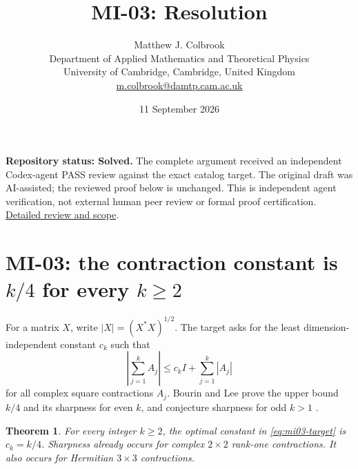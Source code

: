 \documentclass[10pt,a4paper]{article}
\title{MI-03: Resolution}
\author{Matthew J. Colbrook\\
\small Department of Applied Mathematics and Theoretical Physics\\
\small University of Cambridge, Cambridge, United Kingdom\\
\small\href{mailto:m.colbrook@damtp.cam.ac.uk}{m.colbrook@damtp.cam.ac.uk}}
\date{11 September 2026}
\newtheorem{theorem}{Theorem}[section]
\theoremstyle{remark}
\begin{document}
\maketitle
\textbf{Repository status: Solved.}
The complete argument received an independent Codex-agent PASS review
against the exact catalog target.
The original draft was AI-assisted; the reviewed proof below is unchanged.
This is independent agent verification, not external human peer review or
formal proof certification. \href{https://github.com/ajt60gaibb/OpenProblemsInNLA/blob/main/references/colbrook-matrix-2026-09-11/verification/reviews/MI-03-review.md}{Detailed review and scope}.
\par\medskip
\section{MI-03: the contraction constant is $k/4$ for every $k\geq2$}
\label{sec:mi03}

For a matrix $X$, write $|X|=(X^*X)^{1/2}$. The target asks for the least dimension-independent constant $c_k$ such that
\begin{equation}\label{eq:mi03-target}
 \left|\sum_{j=1}^k A_j\right|\leq c_k I+\sum_{j=1}^k|A_j|
\end{equation}
for all complex square contractions $A_j$. Bourin and Lee prove the upper bound $k/4$ and its sharpness for even $k$, and conjecture sharpness for odd $k>1$ \cite[Corollary 4.4 and Remark 4.5]{BL2023}.

\begin{theorem}\label{thm:mi03}
For every integer $k\geq2$, the optimal constant in \eqref{eq:mi03-target} is $c_k=k/4$. Sharpness already occurs for complex $2\times2$ rank-one contractions. It also occurs for Hermitian $3\times3$ contractions.
\end{theorem}
\end{document}
